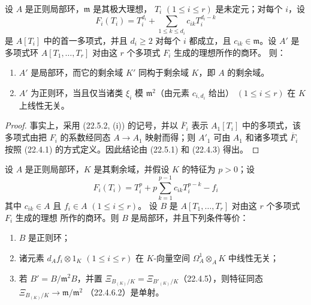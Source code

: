 \begin{corollary}[22.5.3]
\label{0.22.5.3-fr}
设 $A$ 是正则局部环，$\mathfrak m$ 是其极大理想，
$T_i$ $(1\leqslant i\leqslant r)$ 是未定元；对每个 $i$，设
\begin{equation}
\label{0.22.5.3.1-fr}
  F_i(T_i)=T_i^{d_i}+\sum_{1\leqslant k\leqslant d_i}c_{ik}T_i^{d_i-k}
  \tag{22.5.3.1}
\end{equation}
是 $A[T_i]$ 中的首一多项式，并且 $d_i\geqslant2$ 对每个 $i$
都成立，且 $c_{ik}\in\mathfrak m$。设 $A'$ 是多项式环
$A[T_1,\ldots,T_r]$ 对由这 $r$ 个多项式 $F_i$ 生成的理想所作的商环。
则：
\begin{enumerate}
  \item[\rm(i)] $A'$ 是局部环，而它的剩余域 $K'$ 同构于剩余域
  $K$，即 $A$ 的剩余域。
  \item[\rm(ii)] $A'$ 为正则环，当且仅当诸类 $\xi_i$ 模
  $\mathfrak m^2$（由元素 $c_{i,d_i}$ 给出）
  $(1\leqslant i\leqslant r)$ 在 $K$ 上线性无关。
\end{enumerate}
\end{corollary}

\begin{proof}
事实上，采用 (22.5.2, (i)) 的记号，并以 $\overline F_i$ 表示
$A_1[T_i]$ 中的多项式，该多项式由把 $F_i$ 的系数经同态
$A\longrightarrow A_1$ 映射而得；则 $A'_1$ 可由 $A_1$ 和诸多项式
$\overline F_i$ 按照 (22.4.1) 的方式定义。因此结论由 (22.5.1) 和
(22.4.3) 得出。
\end{proof}

\begin{theorem}[22.5.4]
\label{0.22.5.4-fr}
设 $A$ 是正则局部环，$K$ 是其剩余域，并假设 $K$ 的特征为
$p>0$；设
\begin{equation}
\label{0.22.5.4.1-fr}
  F_i(T_i)=T_i^p+p\sum_{k=1}^{p-1}c_{ik}T_i^{p-k}-f_i
  \tag{22.5.4.1}
\end{equation}
其中 $c_{ik}\in A$ 且 $f_i\in A$ $(1\leqslant i\leqslant r)$。
设 $B$ 是 $A[T_1,\ldots,T_r]$ 对由这 $r$ 个多项式 $F_i$ 生成的理想
所作的商环。则 $B$ 是局部环，并且下列条件等价：
\begin{enumerate}
  \item[a)] $B$ 是正则环；
  \item[b)] 诸元素 $d_Af_i\otimes1_K$ $(1\leqslant i\leqslant r)$
  在 $K$-向量空间 $\Omega^1_A\otimes_AK$ 中线性无关；
  \item[c)] 若 $B'=B/\mathfrak m^2B$，并置
  $\Xi_{B_{(K)}/K}=\Xi_{B'_{(K)}/K}$（22.4.5），则特征同态
  $\Xi_{B_{(K)}/K}\longrightarrow\mathfrak m/\mathfrak m^2$
  （22.4.6.2）是单射。
\end{enumerate}
\end{theorem}

